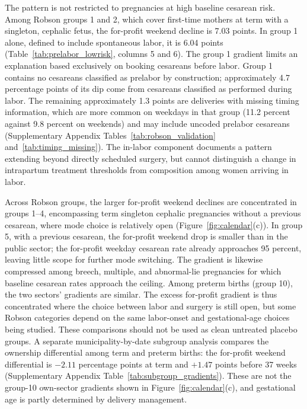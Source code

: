 \documentclass[12pt]{article}
\newcommand{\satab}[1]{Supplementary Appendix Table~\ref{#1}}
\begin{document}
The pattern is not restricted to pregnancies at high baseline cesarean risk. Among Robson groups 1 and 2, which cover first-time mothers at term with a singleton, cephalic fetus, the for-profit weekend decline is 7.03 points. In group 1 alone, defined to include spontaneous labor, it is 6.04 points (Table~\ref{tab:prelabor_lowrisk}, columns 5 and 6). The group 1 gradient limits an explanation based exclusively on booking cesareans before labor. Group 1 contains no cesareans classified as prelabor by construction; approximately 4.7 percentage points of its dip come from cesareans classified as performed during labor. The remaining approximately 1.3 points are deliveries with missing timing information, which are more common on weekdays in that group (11.2 percent against 9.8 percent on weekends) and may include uncoded prelabor cesareans (Supplementary Appendix Tables~\ref{tab:robson_validation} and~\ref{tab:timing_missing}). The in-labor component documents a pattern extending beyond directly scheduled surgery, but cannot distinguish a change in intrapartum treatment thresholds from composition among women arriving in labor.

Across Robson groups, the larger for-profit weekend declines are concentrated in groups 1–4, encompassing term singleton cephalic pregnancies without a previous cesarean, where mode choice is relatively open (Figure~\ref{fig:calendar}(c)). In group 5, with a previous cesarean, the for-profit weekend drop is smaller than in the public sector; the for-profit weekday cesarean rate already approaches 95 percent, leaving little scope for further mode switching. The gradient is likewise compressed among breech, multiple, and abnormal-lie pregnancies for which baseline cesarean rates approach the ceiling. Among preterm births (group 10), the two sectors' gradients are similar. The excess for-profit gradient is thus concentrated where the choice between labor and surgery is still open, but some Robson categories depend on the same labor-onset and gestational-age choices being studied. These comparisons should not be used as clean untreated placebo groups. A separate municipality-by-date subgroup analysis compares the ownership differential among term and preterm births: the for-profit weekend differential is $-2.11$ percentage points at term and $+1.47$ points before 37 weeks (\satab{tab:subgroup_gradients}). These are not the group-10 own-sector gradients shown in Figure~\ref{fig:calendar}(c), and gestational age is partly determined by delivery management.
\end{document}
